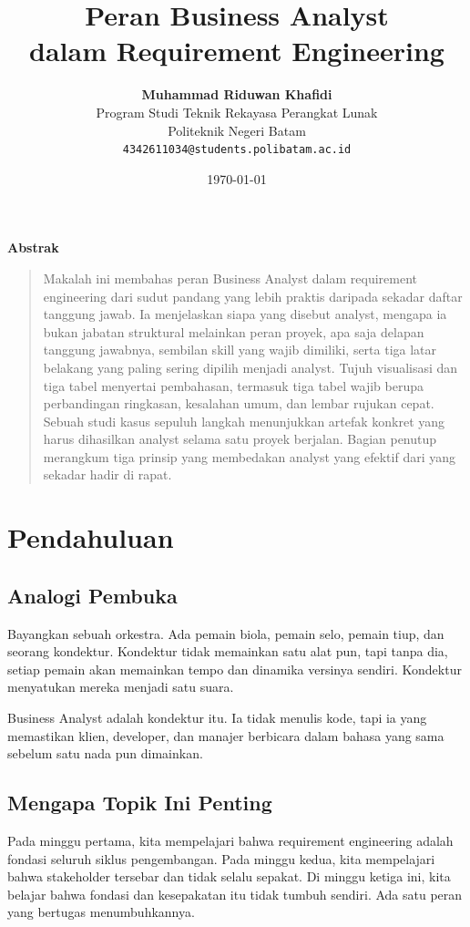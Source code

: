 \documentclass[11pt,a4paper]{article}
\title{\vspace{-1.5cm}\textbf{\sffamily\LARGE Peran Business Analyst\\ dalam Requirement Engineering}}
\author{
	\textbf{Muhammad Riduwan Khafidi} \\
	\small Program Studi Teknik Rekayasa Perangkat Lunak \\
	\small Politeknik Negeri Batam \\
	\small \texttt{4342611034@students.polibatam.ac.id}
}
\date{\small\today}
\renewenvironment{abstract}
{\small
	\begin{center}\textbf{\sffamily Abstrak}\end{center}
	\begin{quote}}
	{\end{quote}}
\begin{document}
\maketitle
\thispagestyle{empty}

\begin{abstract}
	Makalah ini membahas peran Business Analyst dalam requirement engineering dari sudut pandang yang lebih praktis daripada sekadar daftar tanggung jawab. Ia menjelaskan siapa yang disebut analyst, mengapa ia bukan jabatan struktural melainkan peran proyek, apa saja delapan tanggung jawabnya, sembilan skill yang wajib dimiliki, serta tiga latar belakang yang paling sering dipilih menjadi analyst. Tujuh visualisasi dan tiga tabel menyertai pembahasan, termasuk tiga tabel wajib berupa perbandingan ringkasan, kesalahan umum, dan lembar rujukan cepat. Sebuah studi kasus sepuluh langkah menunjukkan artefak konkret yang harus dihasilkan analyst selama satu proyek berjalan. Bagian penutup merangkum tiga prinsip yang membedakan analyst yang efektif dari yang sekadar hadir di rapat.
\end{abstract}

\section{Pendahuluan}

\subsection{Analogi Pembuka}

Bayangkan sebuah orkestra. Ada pemain biola, pemain selo, pemain tiup, dan seorang kondektur. Kondektur tidak memainkan satu alat pun, tapi tanpa dia, setiap pemain akan memainkan tempo dan dinamika versinya sendiri. Kondektur menyatukan mereka menjadi satu suara.

Business Analyst adalah kondektur itu. Ia tidak menulis kode, tapi ia yang memastikan klien, developer, dan manajer berbicara dalam bahasa yang sama sebelum satu nada pun dimainkan.

\subsection{Mengapa Topik Ini Penting}

Pada minggu pertama, kita mempelajari bahwa requirement engineering adalah fondasi seluruh siklus pengembangan. Pada minggu kedua, kita mempelajari bahwa stakeholder tersebar dan tidak selalu sepakat. Di minggu ketiga ini, kita belajar bahwa fondasi dan kesepakatan itu tidak tumbuh sendiri. Ada satu peran yang bertugas menumbuhkannya.
\end{document}
